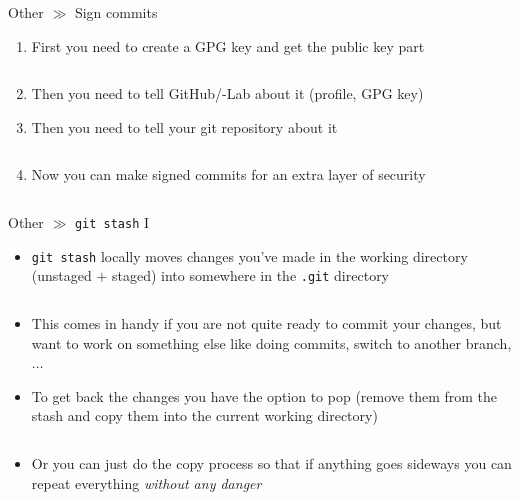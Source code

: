 \documentclass[10pt]{beamer}
\begin{document}
\begin{frame}{Other $\gg$ Sign commits}
	\begin{enumerate}
		\item First you need to create a GPG key and get the public key part
		\inputminted[bgcolor=lightGreyCustom,fontsize=\scriptsize]{sh}{./resources/git_sign_commits_01_gpg_key.sh}
		\item Then you need to tell GitHub/-Lab about it (profile, GPG key)
		\item Then you need to tell your git repository about it
		\inputminted[bgcolor=lightGreyCustom,fontsize=\scriptsize]{sh}{./resources/git_sign_commits_02_register_key.sh}
		\item Now you can make signed commits for an extra layer of security
		\inputminted[bgcolor=lightGreyCustom,fontsize=\scriptsize]{sh}{./resources/git_sign_commits_03_signed_commit.sh}
	\end{enumerate}
\end{frame}

\begin{frame}{Other $\gg$ \texttt{git stash} I}
\begin{itemize}
	\item \texttt{git stash} locally moves changes you've made in the working directory (unstaged $+$ staged) into somewhere in the \texttt{.git} directory
	\inputminted[bgcolor=lightGreyCustom,fontsize=\scriptsize]{sh}{./resources/git_stash_01_stash.sh}
	\item This comes in handy if you are not quite ready to commit your changes, but want to work on something else like doing commits, switch to another branch, $\dots$
	\item To get back the changes you have the option to pop (remove them from the stash and copy them into the current working directory)
	\inputminted[bgcolor=lightGreyCustom,fontsize=\scriptsize]{sh}{./resources/git_stash_02_stash_pop.sh}
	\item Or you can just do the copy process so that if anything goes sideways you can repeat everything \textit{without any danger}
	\inputminted[bgcolor=lightGreyCustom,fontsize=\scriptsize]{sh}{./resources/git_stash_03_stash_apply.sh}
\end{itemize}
\end{frame}
\end{document}
